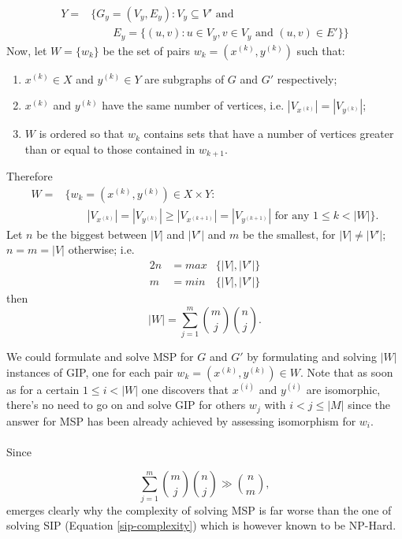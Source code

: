 \documentclass[a4paper,12pt]{article}
\theoremstyle{newplanestyle}
\theoremstyle{newdefinitionstyle}
\theoremstyle{newprovestyle}
\begin{document}
\[
\begin{split}
Y = & \{G_y=(V_y, E_y) : V_y \subseteq V' \text{ and }\\
& \qquad E_y = \{(u,v) : u \in V_y, v \in V_y \text{ and } (u,v) \in E' \}\}
\end{split}
\]
Now, let $W = \{w_k\}$ be the set of pairs $w_k = (x^{(k)}, y^{(k)})$ such that:
\begin{enumerate}
	\item $x^{(k)} \in X$ and $y^{(k)} \in Y$ are subgraphs of $G$ and $G'$ respectively;
	\item $x^{(k)}$ and $y^{(k)}$ have the same number of vertices, i.e. $|V_{x^{(k)}}| = |V_{y^{(k)}}|$;
	\item $W$ is ordered so that $w_{k}$ contains sets that have a number of vertices greater than or equal to those contained in $w_{k+1}$.
\end{enumerate}
Therefore
\[
\begin{split}
W = & \{w_k = (x^{(k)}, y^{(k)}) \in X \times Y : \\
& \qquad |V_{x^{(k)}}| = |V_{y^{(k)}}| \geq |V_{x^{(k+1)}}| = |V_{y^{(k+1)}}| \text{ for any } 1 \leq k < |W| \}.
\end{split}
\]
Let $n$ be the biggest between $|V|$ and $|V'|$ and $m$ be the smallest, for $|V| \neq |V'|$; $n=m=|V|$ otherwise; i.e.
\begin{alignat*}{2}
n & = max&\{|V|, |V'|\}\\
m & = min&\{|V|, |V'|\}
\end{alignat*}
then
\begin{equation*}
|W| = \sum_{j=1}^{m} \binom{m}{j} \binom{n}{j}.
\end{equation*}

We could formulate and solve MSP for $G$ and $G'$ by formulating and solving $|W|$ instances of GIP, one for each pair $w_k = (x^{(k)}, y^{(k)}) \in W$. Note that as soon as for a certain $1 \leq i < |W|$ one discovers that $x^{(i)}$ and $y^{(i)}$ are isomorphic, there's no need to go on and solve GIP for others $w_j$ with $i < j \leq |M|$ since the answer for MSP has been already achieved by assessing isomorphism for $w_i$.
\\
\\
\noindent
Since

\begin{equation*}
\sum_{j=1}^{m} \binom{m}{j} \binom{n}{j} \gg \binom{n}{m},
\end{equation*}
emerges clearly why the complexity of solving MSP is far worse than the one of solving SIP (Equation \ref{sip-complexity}) which is however known to be NP-Hard.

\cleardoublepage

\printbibliography %
\nocite{wiki:gip}
\nocite{wiki:msp}
\end{document}
